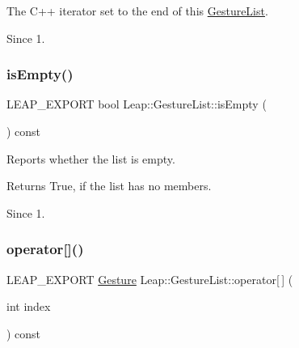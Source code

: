 The C++ iterator set to the end of this \hyperlink{class_leap_1_1_gesture_list}{Gesture\+List}.


\begin{DoxyCodeInclude}
\end{DoxyCodeInclude}


\begin{DoxySince}{Since}
1. 
\end{DoxySince}
\mbox{\label{class_leap_1_1_gesture_list_ab6a03b6ee99ab5aba3b3fc1cdd01ec3a}} 
\subsubsection{\texorpdfstring{is\+Empty()}{isEmpty()}}
{\footnotesize\ttfamily L\+E\+A\+P\+\_\+\+E\+X\+P\+O\+RT bool Leap\+::\+Gesture\+List\+::is\+Empty (\begin{DoxyParamCaption}{ }\end{DoxyParamCaption}) const}

Reports whether the list is empty.


\begin{DoxyCodeInclude}
\end{DoxyCodeInclude}


\begin{DoxyReturn}{Returns}
True, if the list has no members. 
\end{DoxyReturn}
\begin{DoxySince}{Since}
1. 
\end{DoxySince}
\mbox{\label{class_leap_1_1_gesture_list_a7d3fe5d35b5e49f9f2e5949c0bb504f1}} 
\subsubsection{\texorpdfstring{operator[]()}{operator[]()}}
{\footnotesize\ttfamily L\+E\+A\+P\+\_\+\+E\+X\+P\+O\+RT \hyperlink{class_leap_1_1_gesture}{Gesture} Leap\+::\+Gesture\+List\+::operator\mbox{[}$\,$\mbox{]} (\begin{DoxyParamCaption}\item[{int}]{index }\end{DoxyParamCaption}) const}

